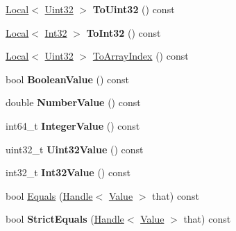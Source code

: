 \begin{DoxyCompactItemize}
\item 
\hypertarget{classv8_1_1_value_aed71590ec8bd5ef7972d7a0d844b2cd7}{}\hyperlink{classv8_1_1_local}{Local}$<$ \hyperlink{classv8_1_1_uint32}{Uint32} $>$ {\bfseries To\+Uint32} () const \label{classv8_1_1_value_aed71590ec8bd5ef7972d7a0d844b2cd7}

\item 
\hypertarget{classv8_1_1_value_adf5d2c0c0bf58d60f2401d8437df26b0}{}\hyperlink{classv8_1_1_local}{Local}$<$ \hyperlink{classv8_1_1_int32}{Int32} $>$ {\bfseries To\+Int32} () const \label{classv8_1_1_value_adf5d2c0c0bf58d60f2401d8437df26b0}

\item 
\hyperlink{classv8_1_1_local}{Local}$<$ \hyperlink{classv8_1_1_uint32}{Uint32} $>$ \hyperlink{classv8_1_1_value_ae810be0ae81a87f677592d0176daac48}{To\+Array\+Index} () const 
\item 
\hypertarget{classv8_1_1_value_a392d60e0ab58b5b13c0ac1e5b4b9f04b}{}bool {\bfseries Boolean\+Value} () const \label{classv8_1_1_value_a392d60e0ab58b5b13c0ac1e5b4b9f04b}

\item 
\hypertarget{classv8_1_1_value_a4634d525bae654cdc50c398bfaee11aa}{}double {\bfseries Number\+Value} () const \label{classv8_1_1_value_a4634d525bae654cdc50c398bfaee11aa}

\item 
\hypertarget{classv8_1_1_value_ac61c74a94dea10f48a64f5906b6dd43d}{}int64\+\_\+t {\bfseries Integer\+Value} () const \label{classv8_1_1_value_ac61c74a94dea10f48a64f5906b6dd43d}

\item 
\hypertarget{classv8_1_1_value_af25557359e6bb79436ed60df18703d66}{}uint32\+\_\+t {\bfseries Uint32\+Value} () const \label{classv8_1_1_value_af25557359e6bb79436ed60df18703d66}

\item 
\hypertarget{classv8_1_1_value_a24daae9d99d02ff2e24b60287dcd4d95}{}int32\+\_\+t {\bfseries Int32\+Value} () const \label{classv8_1_1_value_a24daae9d99d02ff2e24b60287dcd4d95}

\item 
bool \hyperlink{classv8_1_1_value_adc2a7a92a120675bbd4c992163a20869}{Equals} (\hyperlink{classv8_1_1_handle}{Handle}$<$ \hyperlink{classv8_1_1_value}{Value} $>$ that) const 
\item 
\hypertarget{classv8_1_1_value_abb564818715b818957adc97716a076ba}{}bool {\bfseries Strict\+Equals} (\hyperlink{classv8_1_1_handle}{Handle}$<$ \hyperlink{classv8_1_1_value}{Value} $>$ that) const \label{classv8_1_1_value_abb564818715b818957adc97716a076ba}

\end{DoxyCompactItemize}


